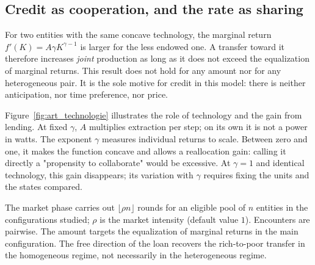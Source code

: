 \subsection{Credit as cooperation, and the rate as sharing}
\label{sec:credit}

For two entities with the same concave technology, the marginal return
$f'(K)=A\gamma K^{\gamma-1}$ is larger for the less endowed one.
A transfer toward it therefore increases \emph{joint} production as
long as it does not exceed the equalization of marginal returns. This
result does not hold for any amount nor for any heterogeneous pair. It
is the sole motive for credit in this model: there is neither
anticipation, nor time preference, nor price.

Figure~\ref{fig:art_technologie} illustrates the role of technology and
the gain from lending. At fixed $\gamma$, $A$ multiplies extraction per
step; on its own it is not a power in watts. The exponent $\gamma$
measures individual returns to scale. Between zero and one, it makes
the function concave and allows a reallocation gain: calling it
directly a "propensity to collaborate" would be excessive. At
$\gamma=1$ and identical technology, this gain disappears; its
variation with $\gamma$ requires fixing the units and the states
compared.


The market phase carries out $\lfloor\rho n\rfloor$ rounds for an
eligible pool of $n$ entities in the configurations studied; $\rho$ is
the market intensity (default value $1$). Encounters are pairwise.
The amount targets the equalization of marginal returns in the main
configuration. The free direction of the loan recovers the rich-to-poor
transfer in the homogeneous regime, not necessarily in the
heterogeneous regime.


